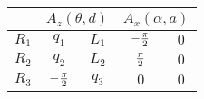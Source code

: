 \begin{tabular}{c|c|c|c|c|}
            \cline{2-5} &
            \multicolumn{2}{|c|}{$A_z(\theta,d)$} &
            \multicolumn{2}{|c|}{$A_x(\alpha,a)$} \\
            \hline
        \multicolumn{1}{|c|}{$R_1$} & $q_{1}$ & $L_{1}$ & $-{{\pi}\over{2}}$ & $0$ \\
            \hline
        \multicolumn{1}{|c|}{$R_2$} & $q_{2}$ & $L_{2}$ & ${{\pi}\over{2}}$ & $0$ \\
            \hline
        \multicolumn{1}{|c|}{$R_3$} & $-{{\pi}\over{2}}$ & $q_{3}$ & $0$ & $0$ \\
            \hline
\end{tabular}
